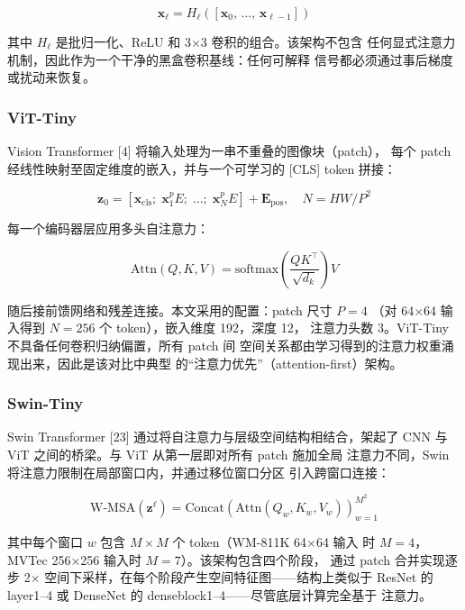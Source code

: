 \documentclass[11pt,a4paper]{article}
\begin{document}
\begin{equation}
\mathbf{x}_\ell = H_\ell\!\left([\mathbf{x}_0,\, \ldots,\, \mathbf{x}_{\ell-1}]\right)
\tag{4}
\end{equation}

其中 $H_\ell$ 是批归一化、ReLU 和 3×3 卷积的组合。该架构不包含 任何显式注意力机制，因此作为一个干净的黑盒卷积基线：任何可解释 信号都必须通过事后梯度或扰动来恢复。

\subsubsection{ViT-Tiny}

Vision Transformer [4] 将输入处理为一串不重叠的图像块（patch）， 每个 patch 经线性映射至固定维度的嵌入，并与一个可学习的 [CLS] token 拼接：

\begin{equation}
\mathbf{z}_0 = [\mathbf{x}_{\text{cls}};\; \mathbf{x}_1^p E;\; \ldots;\; \mathbf{x}_N^p E] + \mathbf{E}_{\text{pos}}, \quad N = HW / P^2
\tag{5}
\end{equation}

每一个编码器层应用多头自注意力：

\begin{equation}
\text{Attn}(Q, K, V) = \text{softmax}\!\left(\frac{QK^\top}{\sqrt{d_k}}\right)V
\tag{6}
\end{equation}

随后接前馈网络和残差连接。本文采用的配置：patch 尺寸 $P{=}4$ （对 64×64 输入得到 $N{=}256$ 个 token），嵌入维度 192，深度 12， 注意力头数 3。ViT-Tiny 不具备任何卷积归纳偏置，所有 patch 间 空间关系都由学习得到的注意力权重涌现出来，因此是该对比中典型 的“注意力优先”（attention-first）架构。

\subsubsection{Swin-Tiny}

Swin Transformer [23] 通过将自注意力与层级空间结构相结合，架起了 CNN 与 ViT 之间的桥梁。与 ViT 从第一层即对所有 patch 施加全局 注意力不同，Swin 将注意力限制在局部窗口内，并通过移位窗口分区 引入跨窗口连接：

\begin{equation}
\text{W-MSA}(\mathbf{z}^{\ell}) = \text{Concat}\left(\text{Attn}(Q_w, K_w, V_w)\right)_{w=1}^{M^2}
\tag{7}
\end{equation}

其中每个窗口 $w$ 包含 $M{\times}M$ 个 token（WM-811K 64×64 输入 时 $M{=}4$，MVTec 256×256 输入时 $M{=}7$）。该架构包含四个阶段， 通过 patch 合并实现逐步 2× 空间下采样，在每个阶段产生空间特征图——结构上类似于 ResNet 的 layer1–4 或 DenseNet 的 denseblock1–4——尽管底层计算完全基于 注意力。
\end{document}
